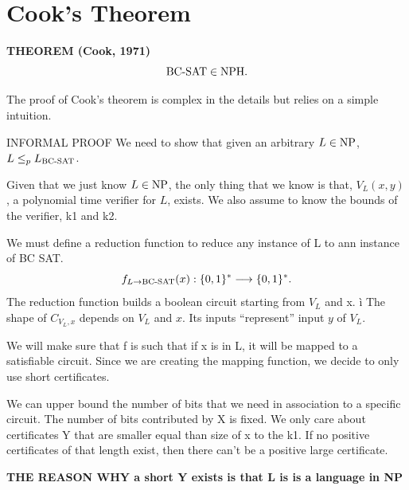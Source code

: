 \section{Cook's Theorem}

\begin{notestheorem}
\textbf{THEOREM (Cook, 1971)}
\[
\mathrm{BC\text{-}SAT}\in\mathrm{NPH}.
\]
\end{notestheorem}

The proof of Cook's theorem is complex in the details but relies on a simple intuition.


{INFORMAL PROOF}
We need to show that given an arbitrary $L\in\mathrm{NP}$, $L\leq_p L_{\mathrm{BC\text{-}SAT}}$.

Given that we just know $L\in\mathrm{NP}$, the only thing that we know is that, $V_L(x,y)$, a polynomial time verifier for $L$, exists. We also assume to know the bounds of the verifier, k1 and k2. 

We must define a reduction function to reduce any instance of L to ann instance of BC SAT.
\[
f_{L\to\mathrm{BC\text{-}SAT}}(x):\{0,1\}^*\longrightarrow\{0,1\}^*.
\]
The reduction function builds a boolean circuit starting from $V_L$ and x. ì
The shape of $C_{V_L,x}$ depends on $V_L$ and $x$. Its inputs ``represent'' input $y$ of $V_L$.

We will make sure that f is such that if x is in L, it will be mapped to a satisfiable circuit. Since we are creating the mapping function, we decide to only use short certificates. 

We can upper bound the number of bits that we need in association to a specific circuit. The number of bits contributed by X is fixed. We only care about certificates Y that are smaller equal than size of x to the k1. If no positive certificates of that length exist, then there can't be a positive large certificate. 

\textbf{THE REASON WHY a short Y exists is that L is is a language in NP}
